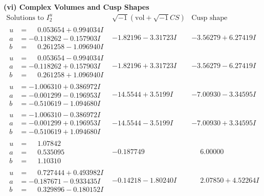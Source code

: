 \documentclass[1p]{elsarticle_modified}
\theoremstyle{definition}
\newcommand{\I}{\sqrt{-1}}
\begin{document}
\newpage\flushleft \textbf{(vi) Complex Volumes and Cusp Shapes}
$$\begin{array}{c|c|c}  
\text{Solutions to }I^u_{2}& \I (\text{vol} + \sqrt{-1}CS) & \text{Cusp shape}\\
 \hline 
\begin{aligned}
u &= \phantom{-}0.053654 + 0.994034 I \\
a &= -0.118262 - 0.157903 I \\
b &= \phantom{-}0.261258 - 1.096940 I\end{aligned}
 & -1.82196 - 3.31723 I & -3.56279 + 6.27419 I \\ \hline\begin{aligned}
u &= \phantom{-}0.053654 - 0.994034 I \\
a &= -0.118262 + 0.157903 I \\
b &= \phantom{-}0.261258 + 1.096940 I\end{aligned}
 & -1.82196 + 3.31723 I & -3.56279 - 6.27419 I \\ \hline\begin{aligned}
u &= -1.006310 + 0.386972 I \\
a &= -0.001299 - 0.196953 I \\
b &= -0.510619 - 1.094680 I\end{aligned}
 & -14.5544 + 3.5199 I & -7.00930 - 3.34595 I \\ \hline\begin{aligned}
u &= -1.006310 - 0.386972 I \\
a &= -0.001299 + 0.196953 I \\
b &= -0.510619 + 1.094680 I\end{aligned}
 & -14.5544 - 3.5199 I & -7.00930 + 3.34595 I \\ \hline\begin{aligned}
u &= \phantom{-}1.07842\phantom{ +0.000000I} \\
a &= \phantom{-}0.535095\phantom{ +0.000000I} \\
b &= \phantom{-}1.10310\phantom{ +0.000000I}\end{aligned}
 & -0.187749\phantom{ +0.000000I} & \phantom{-}6.00000\phantom{ +0.000000I} \\ \hline\begin{aligned}
u &= \phantom{-}0.727444 + 0.493982 I \\
a &= -0.187671 - 0.933435 I \\
b &= \phantom{-}0.329896 - 0.180152 I\end{aligned}
 & -0.14218 - 1.80240 I & \phantom{-}2.07850 + 4.52264 I \\ \hline\begin{aligned}

\end{aligned}
\end{array}$$
\end{document}
